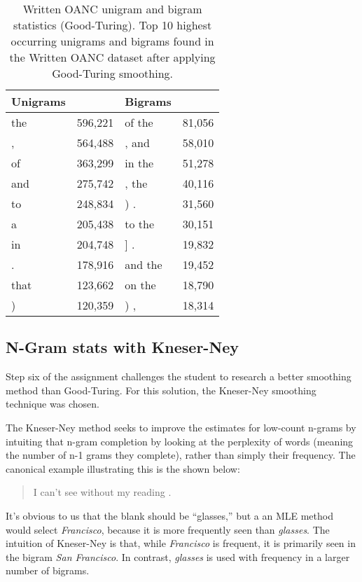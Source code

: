 \documentclass[11pt]{article}
\begin{document}
\begin{table}[h]
\begin{center}
\begin{tabular}{|lr|lr|}
\hline \bf Unigrams & & \bf Bigrams & \\ \hline
the & 596,221     & of the & 81,056 \\
, & 564,488        & , and & 58,010 \\
of & 363,299         & in the & 51,278 \\
and & 275,742     & , the & 40,116 \\
to & 248,834      & ) . & 31,560 \\
a & 205,438        & to the & 30,151 \\
in & 204,748       & ] . & 19,832 \\
. & 178,916       & and the & 19,452 \\
that & 123,662    & on the & 18,790 \\
) & 120,359        & ) , & 18,314 \\
\hline
\end{tabular}
\end{center}
\caption{\label{tokenStats} Written OANC unigram and bigram statistics (Good-Turing).
Top 10 highest occurring unigrams and bigrams found in the Written OANC dataset after
applying Good-Turing smoothing.}
\end{table}

\subsection{N-Gram stats with Kneser-Ney}
Step six of the assignment challenges the student to research a better smoothing method
than Good-Turing.  For this solution, the Kneser-Ney smoothing technique was chosen.

The Kneser-Ney method seeks to improve the estimates for low-count n-grams by intuiting
that n-gram completion by looking at the perplexity of words (meaning the number of n-1 grams
they complete), rather than simply their frequency. The canonical example illustrating this
is the shown below:

\begin{quote}
I can't see without my reading \underline{\hspace{1cm}}.
\end{quote}

It's obvious to us that the blank should be ``glasses,'' but a an MLE method would select
{\em Francisco}, because it is more frequently seen than {\em glasses}.  The intuition of
Kneser-Ney is that, while {\em Francisco} is frequent, it is primarily seen in the bigram
{\em San Francisco}.  In contrast, {\em glasses} is used with frequency in a larger number
of bigrams.
\end{document}
